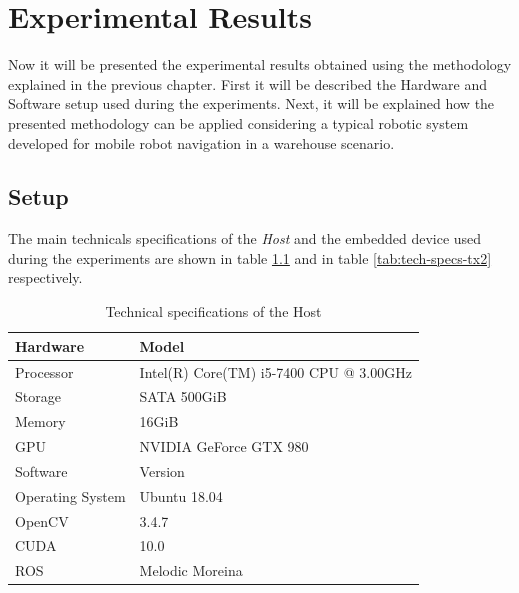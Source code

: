 \chapter{Experimental Results} \label{chap:experimental-results}
Now it will be presented the experimental results obtained using the methodology explained in the previous chapter.
First it will be described the Hardware and Software setup used during the experiments. Next, it will be explained how the presented methodology can be applied considering a typical robotic system developed for mobile robot navigation in a warehouse scenario.

\section{Setup}
The main technicals specifications of the \textit{Host} and the embedded device used during the experiments are shown in table \ref{tab:tech-specs-host} and in table \ref{tab:tech-specs-tx2} respectively. 

\begin{table}[htbp]
	\centering
	\begin{tabularx}{\linewidth}{|l|X|}
		\hline
		\rowcolor{Gray}
		Hardware         & Model \\
		\hline
		Processor        & Intel(R) Core(TM) i5-7400 CPU @ 3.00GHz \\
		Storage          & SATA 500GiB \\
		Memory           & 16GiB \\
		GPU              & NVIDIA GeForce GTX 980 \\
		\hline
		\rowcolor{Gray}
		Software         & Version \\
		\hline
		Operating System & Ubuntu 18.04 \\
		OpenCV           & 3.4.7 \\
		CUDA             & 10.0 \\
		ROS              & Melodic Moreina \\
		\hline
	\end{tabularx}
	\caption{Technical specifications of the Host \label{tab:tech-specs-host}}
\end{table}

